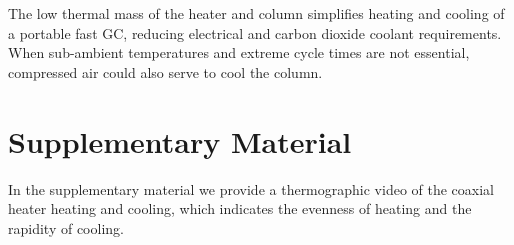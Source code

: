 \documentclass[aip,rsi,preprint,graphicx]{revtex4-1} %
\begin{document}
The low thermal mass of the heater and column simplifies heating and cooling of
a portable fast GC, reducing electrical and carbon dioxide coolant requirements.
When sub-ambient temperatures and extreme cycle times are not essential,
compressed air could also serve to cool the column.


%
%

%

\section*{Supplementary Material}

In the supplementary material we provide a thermographic video of the coaxial
heater heating and cooling, which indicates the evenness of heating and the
rapidity of cooling.

\end{document}
